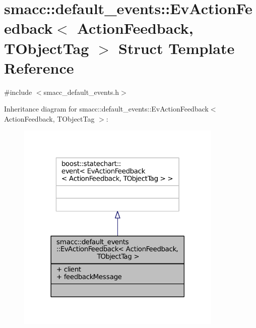 \hypertarget{structsmacc_1_1default__events_1_1EvActionFeedback}{}\section{smacc\+:\+:default\+\_\+events\+:\+:Ev\+Action\+Feedback$<$ Action\+Feedback, T\+Object\+Tag $>$ Struct Template Reference}
\label{structsmacc_1_1default__events_1_1EvActionFeedback}


{\ttfamily \#include $<$smacc\+\_\+default\+\_\+events.\+h$>$}



Inheritance diagram for smacc\+:\+:default\+\_\+events\+:\+:Ev\+Action\+Feedback$<$ Action\+Feedback, T\+Object\+Tag $>$\+:
\nopagebreak
\begin{figure}[H]
\begin{center}
\leavevmode
\includegraphics[width=278pt]{structsmacc_1_1default__events_1_1EvActionFeedback__inherit__graph}
\end{center}
\end{figure}


